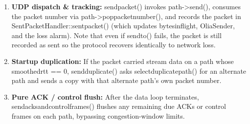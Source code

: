 \documentclass[10pt,a4paper]{article}
\newcommand{\codeul}{\textunderscore\hspace{0pt}}
\DeclareRobustCommand{\code}[1]{{\ttfamily\let\_\codeul #1}}
\begin{document}
\begin{enumerate}
    \item \textbf{UDP dispatch \& tracking:} \code{send\_packet()} invokes \code{path->send()}, consumes the packet number via \code{path->pop\_packet\_number()}, and records the packet in \code{SentPacketHandler::sent\_packet()} (which updates \code{bytes\_in\_flight}, \code{OliaSender}, and the loss alarm). Note that even if \code{sendto()} fails, the packet is still recorded as sent so the protocol recovers identically to network loss.
    \item \textbf{Startup duplication:} If the packet carried stream data on a path whose \code{smoothed\_rtt == 0}, \code{send\_duplicate()} asks \code{select\_duplicate\_path()} for an alternate path and sends a copy with that alternate path's own packet number.
    \item \textbf{Pure ACK / control flush:} After the data loop terminates, \code{send\_acks\_and\_control\_frames()} flushes any remaining due ACKs or control frames on each path, bypassing congestion-window limits.
\end{enumerate}
\end{document}
